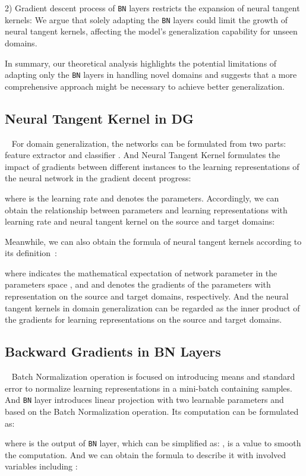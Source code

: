 \documentclass{article} \usepackage{iclr2024_conference,times}
\begin{document}
2) Gradient descent process of \texttt{BN} layers restricts the expansion of neural tangent kernels: We argue that solely adapting the \texttt{BN} layers could limit the growth of neural tangent kernels, affecting the model's generalization capability for unseen domains.

In summary, our theoretical analysis highlights the potential limitations of adapting only the \texttt{BN} layers in handling novel domains and suggests that a more comprehensive approach might be necessary to achieve better generalization.\par
\subsection{Neural Tangent Kernel in DG}~\label{sec:theory:nek+dg}
For domain generalization, the networks can be formulated from two parts: feature extractor  and classifier . And Neural Tangent Kernel  formulates the impact of gradients between different instances  to the learning representations of the neural network in the gradient decent progress:

where  is the learning rate and  denotes the parameters.
Accordingly, we can obtain the relationship between parameters and learning representations with learning rate  and neural tangent kernel  on the source and target domains:

Meanwhile, we can also obtain the formula of neural tangent kernels according to its definition~\cite{jacot2018neural}:

where  indicates the mathematical expectation of network parameter in the parameters space , and  and  denotes the gradients of the parameters with representation on the source and target domains, respectively. And the neural tangent kernels in domain generalization can be regarded as the inner product of the gradients for learning representations on the source and target domains.
\subsection{Backward Gradients in BN Layers}~\label{sec:theory:bn}
Batch Normalization operation is focused on introducing means  and standard error  to normalize learning representations in a mini-batch  containing  samples. And \texttt{BN} layer introduces linear projection with two learnable parameters  and  based on the Batch Normalization operation. Its computation can be formulated as:

where  is the output of \texttt{BN} layer, which can be simplified as: ,  is a value to smooth the computation. And we can obtain the formula to describe it with involved variables including :
 
\end{document}
